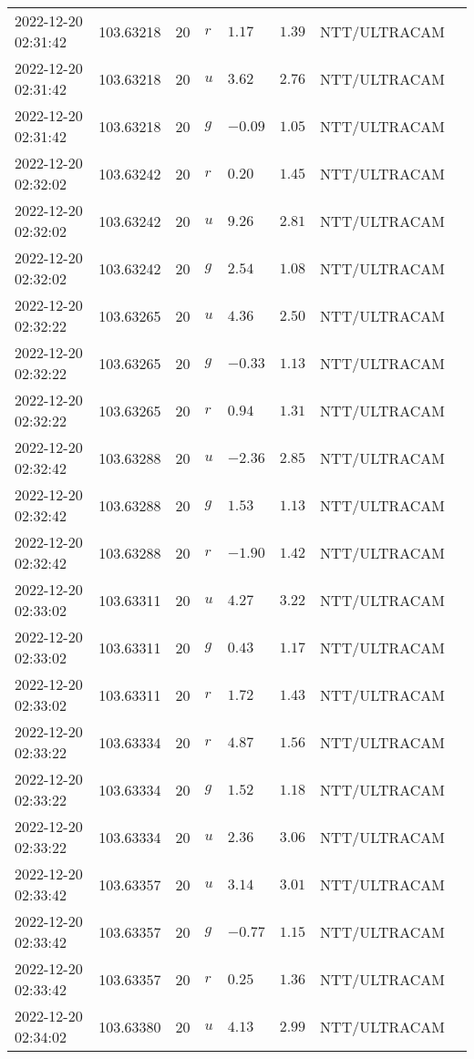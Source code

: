 \documentclass{nature_plusfigure}
\begin{document}
\begin{supplement}
\begin{center}
\begin{longtable}{llllllll}
2022-12-20 02:31:42 & 103.63218 & 20 & $r$ & $1.17$ & $1.39$ & NTT/ULTRACAM &  \\ 
2022-12-20 02:31:42 & 103.63218 & 20 & $u$ & $3.62$ & $2.76$ & NTT/ULTRACAM &  \\ 
2022-12-20 02:31:42 & 103.63218 & 20 & $g$ & $-0.09$ & $1.05$ & NTT/ULTRACAM &  \\ 
2022-12-20 02:32:02 & 103.63242 & 20 & $r$ & $0.20$ & $1.45$ & NTT/ULTRACAM &  \\ 
2022-12-20 02:32:02 & 103.63242 & 20 & $u$ & $9.26$ & $2.81$ & NTT/ULTRACAM &  \\ 
2022-12-20 02:32:02 & 103.63242 & 20 & $g$ & $2.54$ & $1.08$ & NTT/ULTRACAM &  \\ 
2022-12-20 02:32:22 & 103.63265 & 20 & $u$ & $4.36$ & $2.50$ & NTT/ULTRACAM &  \\ 
2022-12-20 02:32:22 & 103.63265 & 20 & $g$ & $-0.33$ & $1.13$ & NTT/ULTRACAM &  \\ 
2022-12-20 02:32:22 & 103.63265 & 20 & $r$ & $0.94$ & $1.31$ & NTT/ULTRACAM &  \\ 
2022-12-20 02:32:42 & 103.63288 & 20 & $u$ & $-2.36$ & $2.85$ & NTT/ULTRACAM &  \\ 
2022-12-20 02:32:42 & 103.63288 & 20 & $g$ & $1.53$ & $1.13$ & NTT/ULTRACAM &  \\ 
2022-12-20 02:32:42 & 103.63288 & 20 & $r$ & $-1.90$ & $1.42$ & NTT/ULTRACAM &  \\ 
2022-12-20 02:33:02 & 103.63311 & 20 & $u$ & $4.27$ & $3.22$ & NTT/ULTRACAM &  \\ 
2022-12-20 02:33:02 & 103.63311 & 20 & $g$ & $0.43$ & $1.17$ & NTT/ULTRACAM &  \\ 
2022-12-20 02:33:02 & 103.63311 & 20 & $r$ & $1.72$ & $1.43$ & NTT/ULTRACAM &  \\ 
2022-12-20 02:33:22 & 103.63334 & 20 & $r$ & $4.87$ & $1.56$ & NTT/ULTRACAM &  \\ 
2022-12-20 02:33:22 & 103.63334 & 20 & $g$ & $1.52$ & $1.18$ & NTT/ULTRACAM &  \\ 
2022-12-20 02:33:22 & 103.63334 & 20 & $u$ & $2.36$ & $3.06$ & NTT/ULTRACAM &  \\ 
2022-12-20 02:33:42 & 103.63357 & 20 & $u$ & $3.14$ & $3.01$ & NTT/ULTRACAM &  \\ 
2022-12-20 02:33:42 & 103.63357 & 20 & $g$ & $-0.77$ & $1.15$ & NTT/ULTRACAM &  \\ 
2022-12-20 02:33:42 & 103.63357 & 20 & $r$ & $0.25$ & $1.36$ & NTT/ULTRACAM &  \\ 
2022-12-20 02:34:02 & 103.63380 & 20 & $u$ & $4.13$ & $2.99$ & NTT/ULTRACAM &  \\ 

\end{longtable}
\end{center}
\end{supplement}
\end{document}
